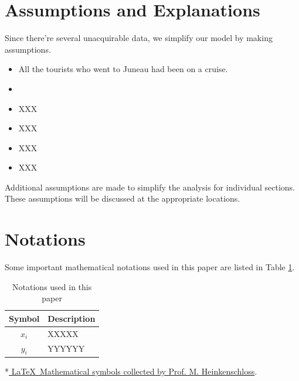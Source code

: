 \documentclass[12pt]{article}  %
\begin{document}
 
 \section{Assumptions and Explanations}
 
Since there're several unacquirable data, we simplify our model by making assumptions.
 
 \begin{itemize}
     \setlength{\parsep}{0ex} %
     \setlength{\topsep}{2ex} %
     \setlength{\itemsep}{1ex} %
     \item[\bfseries \textit{Assumption} 1:] All the tourists who went to Juneau had been on a cruise.
     \item[\bfseries \textit{Explanation:}]  
     \vspace{1ex}
     \item[\bfseries \textit{Assumption} 2:]  XXX
     \item[\bfseries \textit{Explanation:}]  XXX
     \vspace{1ex}
         \item[\bfseries \textit{Assumption} 3:]  XXX
     \item[\bfseries \textit{Explanation:}]  XXX
 \end{itemize}
 
 Additional assumptions are made to simplify the analysis for individual sections. These assumptions will be discussed at the appropriate locations.
 
 \section{Notations}
 Some important mathematical notations used in this paper are listed in Table \ref{tab1}. 
 \begin{table}[htbp]
 \begin{center}
 \caption{Notations used in this paper}
 \begin{tabular}{cl} %
 \toprule[2pt]
 \multicolumn{1}{m{4cm}}{\centering Symbol}
 &\multicolumn{1}{m{10cm}}{\centering Description }\\  %
 \midrule
 $x_i$   & XXXXX \\
 $y_i$   & YYYYYY \\
 \bottomrule[2pt]
 \end{tabular}	\label{tab1} %
  \begin{tablenotes}
         \footnotesize
         \item[*] *\href{https://www.caam.rice.edu/~heinken/latex/symbols.pdf}{ \LaTeX~Mathematical symbols collected by Prof. M. Heinkenschloss}. %
       \end{tablenotes}
 \end{center}
 \end{table} 
 \vspace{-1cm} 
 
\end{document}
